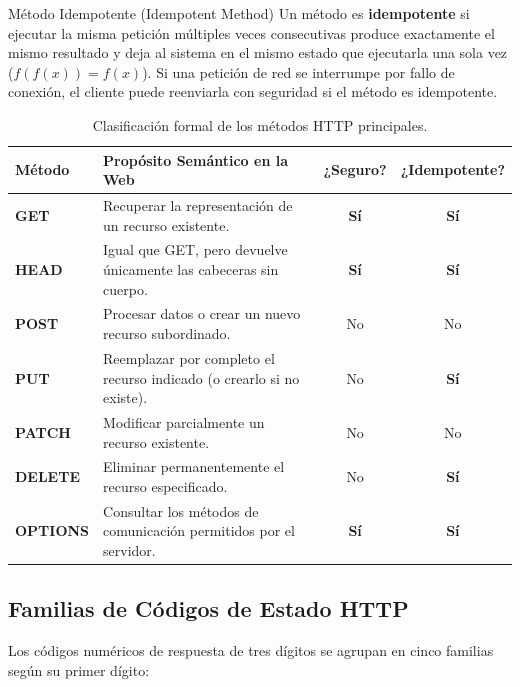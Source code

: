 \begin{definicion}{Método Idempotente (Idempotent Method)}
Un método es \textbf{idempotente} si ejecutar la misma petición múltiples veces consecutivas produce exactamente el mismo resultado y deja al sistema en el mismo estado que ejecutarla una sola vez ($f(f(x)) = f(x)$). Si una petición de red se interrumpe por fallo de conexión, el cliente puede reenviarla con seguridad si el método es idempotente.
\end{definicion}

\begin{table}[htbp]
\centering
\caption{Clasificación formal de los métodos HTTP principales.}
\label{tab:metodos-http}
\begin{tabularx}{\textwidth}{l X c c}
\toprule
\textbf{Método} & \textbf{Propósito Semántico en la Web} & \textbf{¿Seguro?} & \textbf{¿Idempotente?} \\
\midrule
\textbf{GET} & Recuperar la representación de un recurso existente. & \textbf{Sí} & \textbf{Sí} \\
\textbf{HEAD} & Igual que GET, pero devuelve únicamente las cabeceras sin cuerpo. & \textbf{Sí} & \textbf{Sí} \\
\textbf{POST} & Procesar datos o crear un nuevo recurso subordinado. & No & No \\
\textbf{PUT} & Reemplazar por completo el recurso indicado (o crearlo si no existe). & No & \textbf{Sí} \\
\textbf{PATCH} & Modificar parcialmente un recurso existente. & No & No \\
\textbf{DELETE} & Eliminar permanentemente el recurso especificado. & No & \textbf{Sí} \\
\textbf{OPTIONS} & Consultar los métodos de comunicación permitidos por el servidor. & \textbf{Sí} & \textbf{Sí} \\
\bottomrule
\end{tabularx}
\end{table}

\subsection{Familias de Códigos de Estado HTTP}

Los códigos numéricos de respuesta de tres dígitos se agrupan en cinco familias según su primer dígito:

